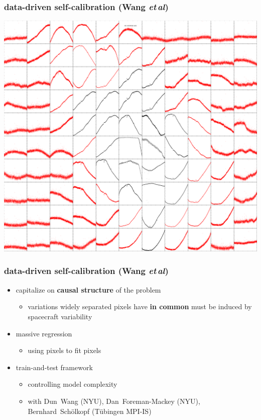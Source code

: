 \documentclass{beamer}
\newcommand{\foreign}[1]{\textsl{#1}}
\newcommand{\etal}{\foreign{et\,al}}
\renewcommand{\emph}[1]{\textbf{#1}}
\begin{document}
\begin{frame}
  \frametitle{data-driven self-calibration \small{(Wang \etal)}}
  \includegraphics[height=0.9\textheight]{kic_03544595_05_pixels.png}
\end{frame}

\begin{frame}
  \frametitle{data-driven self-calibration \small{(Wang \etal)}}
  \begin{itemize}
  \item capitalize on \emph{causal structure} of the problem
    \begin{itemize}
    \item variations widely separated pixels have \emph{in common} must be induced by spacecraft variability
    \end{itemize}
  \item massive regression
    \begin{itemize}
    \item using pixels to fit pixels
    \end{itemize}
  \item train-and-test framework
    \begin{itemize}
    \item controlling model complexity
    \item with Dun~Wang (NYU), Dan~Foreman-Mackey (NYU), Bernhard~Sch\"olkopf (T\"ubingen MPI-IS)
    \end{itemize}
  \end{itemize}
\end{frame}
\end{document}
